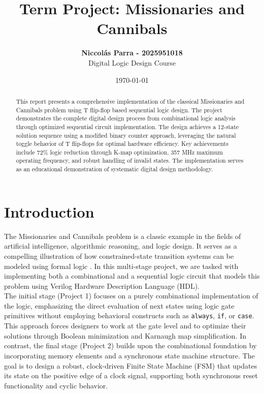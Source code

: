 \documentclass[10pt,a4paper]{article}
\title{\textbf{Term Project: Missionaries and Cannibals}}
\author{\textbf{Niccolás Parra - 2025951018} \\ Digital Logic Design Course}
\date{\today}
\begin{document}
\maketitle

\begin{abstract}
\noindent This report presents a comprehensive implementation of the classical Missionaries and Cannibals problem using T flip-flop based sequential logic design. The project demonstrates the complete digital design process from combinational logic analysis through optimized sequential circuit implementation. The design achieves a 12-state solution sequence using a modified binary counter approach, leveraging the natural toggle behavior of T flip-flops for optimal hardware efficiency. Key achievements include 72\% logic reduction through K-map optimization, 357 MHz maximum operating frequency, and robust handling of invalid states. The implementation serves as an educational demonstration of systematic digital design methodology.
\end{abstract}



\section*{Introduction}

\noindent The Missionaries and Cannibals problem is a classic example in the fields of artificial intelligence, algorithmic reasoning, and logic design. It serves as a compelling illustration of how constrained-state transition systems can be modeled using formal logic \cite{brown2012fundamentals}. In this multi-stage project, we are tasked with implementing both a combinational and a sequential logic circuit that models this problem using Verilog Hardware Description Language (HDL).\\

\noindent The initial stage (Project 1) focuses on a purely combinational implementation of the logic, emphasizing the direct evaluation of next states using logic gate primitives without employing behavioral constructs such as \texttt{always}, \texttt{if}, or \texttt{case}. This approach forces designers to work at the gate level and to optimize their solutions through Boolean minimization and Karnaugh map simplification. In contrast, the final stage (Project 2) builds upon the combinational foundation by incorporating memory elements and a synchronous state machine structure. The goal is to design a robust, clock-driven Finite State Machine (FSM) that updates its state on the positive edge of a clock signal, supporting both synchronous reset functionality and cyclic behavior.\\
\end{document}

